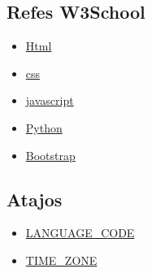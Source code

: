 \documentclass[10pt]{article}
\begin{document}
\subsection{Refes W3School}
\begin{itemize}
\item {\textcolor{B}{\href{https://www.w3schools.com/html/}{Html}}}

\item {\textcolor{B}{\href{https://www.w3schools.com/css/default.asp}{css}}}

\item {\textcolor{B}{\href{https://www.w3schools.com/js/default.asp}{javascript}}}

\item {\textcolor{B}{\href{https://www.w3schools.com/python/default.asp}{Python}}}

\item {\textcolor{B}{\href{https://www.w3schools.com/bootstrap/bootstrap_ver.asp}{Bootstrap}}}
\end{itemize}

\subsection{Atajos}

\begin{itemize}
\item {\textcolor{B}{\href{http://www.i18nguy.com/unicode/language-identifiers.html}{LANGUAGE\_CODE}}}

\item {\textcolor{B}{\href{https://en.wikipedia.org/wiki/List_of_tz_database_time_zones}{TIME\_ZONE}}}


\end{itemize}
\end{document}
